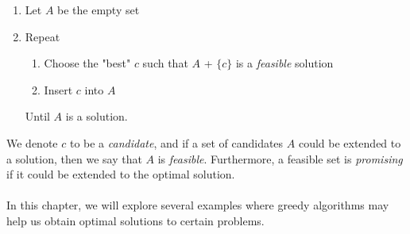 \documentclass[a4paper]{article}
\begin{document}
\begin{enumerate}
	\item Let $A$ be the empty set
	\item Repeat
		\begin{enumerate}
			\item Choose the "best" $c$ such that $A$ + $\{c\}$ is a \textit{feasible} solution
			\item Insert $c$ into $A$
		\end{enumerate}
		Until $A$ is a solution.
\end{enumerate}
We denote $c$ to be a \textit{candidate}, and if a set of candidates $A$ could be extended to a solution, then we say that $A$ is \textit{feasible}. Furthermore, a feasible set is \textit{promising} if it could be extended to the optimal solution.\\ \\
In this chapter, we will explore several examples where greedy algorithms may help us obtain optimal solutions to certain problems.
\end{document}

